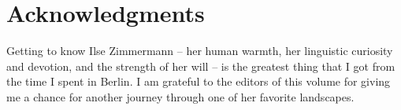 \documentclass[output=paper,colorlinks,citecolor=brown]{langscibook}
\begin{document}
\section*{Acknowledgments}
Getting to know Ilse Zimmermann -- her human warmth, her linguistic curiosity and devotion, and the strength of her will -- is the greatest thing that I got from the time I spent in Berlin. I am grateful to the editors of this volume for giving me a chance for another journey through one of her favorite landscapes. 


\printbibliography[heading=subbibliography,notkeyword=this]
\end{document}
